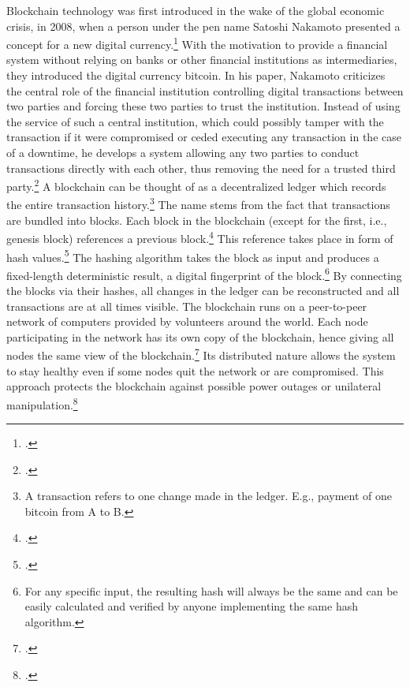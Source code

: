 Blockchain technology was first introduced in the wake of the global economic crisis, in 2008, when a person under the pen name Satoshi Nakamoto presented a concept for a new digital currency.\footcite[Cf.][]{Nakamoto.2008} With the motivation to provide a financial system without relying on banks or other financial institutions as intermediaries, they introduced the digital currency bitcoin. In his paper, Nakamoto criticizes the central role of the financial institution controlling digital transactions between two parties and forcing these two parties to trust the institution. Instead of using the service of such a central institution, which could possibly tamper with the transaction if it were compromised or ceded executing any transaction in the case of a downtime, he develops a system allowing any two parties to conduct transactions directly with each other, thus removing the need for a trusted third party.\footcite[Cf.][p.2]{Nakamoto.2008} A blockchain can be thought of as a decentralized ledger which records the entire transaction history.\footnote{A transaction refers to one change made in the ledger. E.g., payment of one bitcoin from A to B.} The name stems from the fact that transactions are bundled into blocks. Each block in the blockchain (except for the first, i.e., genesis block) references a previous block.\footcite[Cf.][chapter 1]{BashirMasteringBlockchain2017} This reference takes place in form of hash values.\footcite[Cf.][p.351]{AntonopolousAndreasM..2017} The hashing algorithm takes the block as input and produces a fixed-length deterministic result, a digital fingerprint of the block.\footnote{For any specific input, the resulting hash will always be the same and can be easily calculated and verified by anyone implementing the same hash algorithm.} By connecting the blocks via their hashes, all changes in the ledger can be reconstructed and all transactions are at all times visible. The blockchain runs on a peer-to-peer network of computers provided by volunteers around the world. Each node participating in the network has its own copy of the blockchain, hence giving all nodes the same view of the blockchain.\footcites[Cf.][p.5]{Tapscott.2017}[cf.][p.41]{Welzel.2017} Its distributed nature allows the system to stay healthy even if some nodes quit the network or are compromised. This approach protects the blockchain against possible power outages or unilateral manipulation.\footcite[Cf.][p.8]{Nakamoto.2008}

